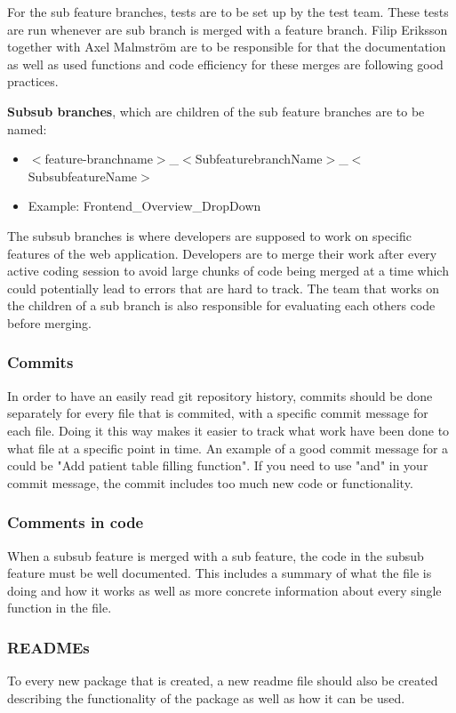 For the sub feature branches, tests are to be set up by the test team. These tests are run whenever are sub branch is merged with a feature branch. Filip Eriksson together with Axel Malmström are to be responsible for that the documentation as well as used functions and code efficiency for these merges are following good practices.

\textbf{Subsub branches}, which are children of the sub feature branches are to be named: 
\begin{itemize}
    \item $<$feature-branchname$>$\_$<$SubfeaturebranchName$>$\_$<$SubsubfeatureName$>$
    \item Example: Frontend\_Overview\_DropDown
\end{itemize}


The subsub branches is where developers are supposed to work on specific features of the web application. Developers are to merge their work after every active coding session to avoid large chunks of code being merged at a time which could potentially lead to errors that are hard to track. The team that works on the children of a sub branch is also responsible for evaluating each others code before merging. 


\subsubsection{Commits}
In order to have an easily read git repository history, commits should be done separately for every file that is commited, with a specific commit message for each file. Doing it this way makes it easier to track what work have been done to what file at a specific point in time. An example of a good commit message for a could be "Add patient table filling function". If you need to use "and" in your commit message, the commit includes too much new code or functionality.

\subsubsection{Comments in code}
When a subsub feature is merged with a sub feature, the code in the subsub feature must be well documented. This includes a summary of what the file is doing and how it works as well as more concrete information about every single function in the file. 

\subsubsection{READMEs}
To every new package that is created, a new readme file should also be created describing the functionality of the package as well as how it can be used. 



